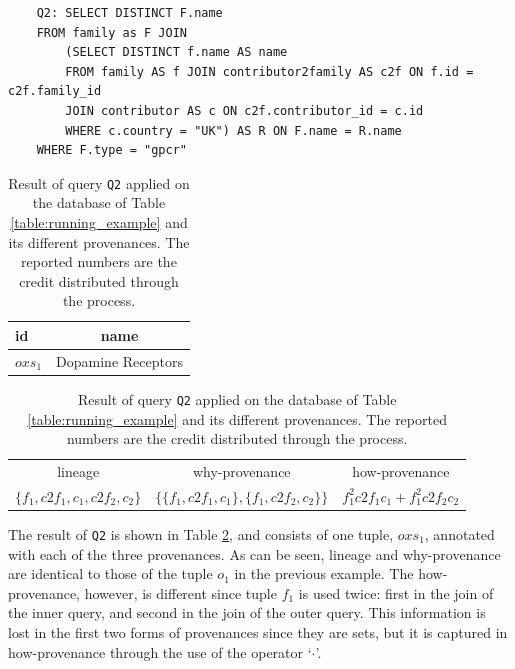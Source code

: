 \documentclass[preprint,12pt,sort&compress]{elsarticle}
\newcommand{\scream}[1]{{\bf * #1 *}{\typeout{#1}}}
\begin{document}
\vspace{2mm}
{\footnotesize
\begin{adjustwidth}{25pt}{5pt}
\begin{verbatim}
	Q2: SELECT DISTINCT F.name 
	FROM family as F JOIN
		(SELECT DISTINCT f.name AS name
		FROM family AS f JOIN contributor2family AS c2f ON f.id = c2f.family_id
		JOIN contributor AS c ON c2f.contributor_id = c.id
		WHERE c.country = "UK") AS R ON F.name = R.name
	WHERE F.type = "gpcr"
\end{verbatim}	
\end{adjustwidth}
}
\vspace{2mm}

\begin{table}[]
\centering
  \begin{tabular}{|l||c|}
  \hline
    id & name\\
    \hline
    $oxs_1$ &  Dopamine Receptors\\
    \hline
  \end{tabular}
  \newline
\vspace{2mm}
  \begin{tabular}{c | c | c}
  	lineage & why-provenance & how-provenance   \\
  	$\{f_1, c2f_1, c_1, c2f_2, c_2\}$ & $\{\{f_1, c2f_1, c_1\}, \{f_1, c2f_2, c_2\}\}$ & $f_1^2 c2f_1 c_1 + f_1^2 c2f_2 c_2$\\
  \end{tabular}
    \caption{Result of query \texttt{Q2} applied on the database of Table \ref{table:running_example} and its different provenances. The reported numbers are the credit distributed through the process.}
  \label{table:difference_result}
\end{table}

The result of \texttt{Q2} is shown in Table \ref{table:difference_result}, and consists of one tuple, $oxs_1$, annotated with each of the three provenances. As can be seen, lineage and why-provenance are identical to those of the tuple $o_1$ in the previous example. 
The how-provenance, however, is different since tuple $f_1$ is used twice: first in the join of the inner query, and second in the join of the outer query. This information is lost in the first two forms of provenances since they are sets, but it is captured in how-provenance through the use of the operator `$\cdot$'.

\end{document}

